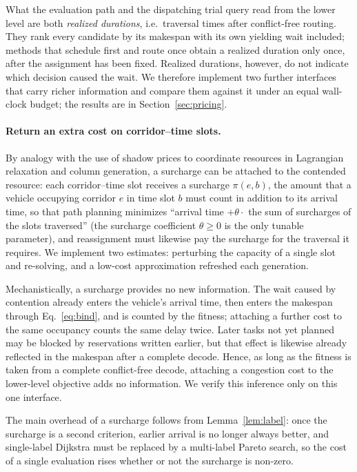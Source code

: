 \documentclass[manuscript,screen,review]{acmart}
\begin{document}
What the evaluation path and the dispatching trial query read from the lower level are both \emph{realized durations}, i.e.\ traversal times after conflict-free routing. They rank every candidate by its makespan with its own yielding wait included; methods that schedule first and route once obtain a realized duration only once, after the assignment has been fixed. Realized durations, however, do not indicate which decision caused the wait. We therefore implement two further interfaces that carry richer information and compare them against it under an equal wall-clock budget; the results are in Section~\ref{sec:pricing}.

\paragraph{Return an extra cost on corridor--time slots.}
By analogy with the use of shadow prices to coordinate resources in Lagrangian relaxation and column generation, a surcharge can be attached to the contended resource: each corridor--time slot receives a surcharge $\pi(e,b)$, the amount that a vehicle occupying corridor $e$ in time slot $b$ must count in addition to its arrival time,
so that path planning minimizes ``arrival time $+\theta\cdot$ the sum of surcharges of the slots traversed'' (the surcharge coefficient $\theta\ge0$ is the only tunable parameter), and reassignment must likewise pay the surcharge for the traversal it requires.
We implement two estimates: perturbing the capacity of a single slot and re-solving, and a low-cost approximation refreshed each generation.

Mechanistically, a surcharge provides no new information. The wait caused by contention already enters the vehicle's arrival time, then enters the makespan through Eq.~\eqref{eq:bind}, and is counted by the fitness;
attaching a further cost to the same occupancy counts the same delay twice. Later tasks not yet planned may be blocked by reservations written earlier, but that effect is likewise already reflected in the makespan after a complete decode.
Hence, as long as the fitness is taken from a complete conflict-free decode, attaching a congestion cost to the lower-level objective adds no information. We verify this inference only on this one interface.

The main overhead of a surcharge follows from Lemma~\ref{lem:label}: once the surcharge is a second criterion, earlier arrival is no longer always better, and single-label Dijkstra must be replaced by a multi-label Pareto search,
so the cost of a single evaluation rises whether or not the surcharge is non-zero.
\end{document}
